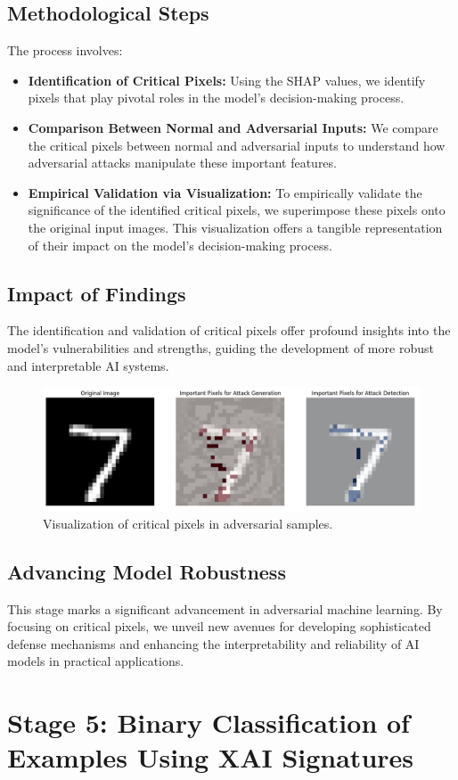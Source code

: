 \documentclass[10pt, conference, a4paper, final]{IEEEtran}
\begin{document}
    \subsection{Methodological Steps}
    The process involves:
    \begin{itemize}
        \item \textbf{Identification of Critical Pixels:} Using the SHAP values, we identify pixels that play pivotal roles in the model's decision-making process.
        \item \textbf{Comparison Between Normal and Adversarial Inputs:} We compare the critical pixels between normal and adversarial inputs to understand how adversarial attacks manipulate these important features.
        \item \textbf{Empirical Validation via Visualization:} To empirically validate the significance of the identified critical pixels, we superimpose these pixels onto the original input images. This visualization offers a tangible representation of their impact on the model's decision-making process.
    \end{itemize}
    
    \subsection{Impact of Findings}
    The identification and validation of critical pixels offer profound insights into the model's vulnerabilities and strengths, guiding the development of more robust and interpretable AI systems.
    
    \begin{figure}[h]
        \centering
        \includegraphics[width=\linewidth]{paper_images/criticalpixels.png}
        \caption{Visualization of critical pixels in adversarial samples.}
        \label{fig:adversarial}
    \end{figure}
    
    \subsection{Advancing Model Robustness}
    This stage marks a significant advancement in adversarial machine learning. By focusing on critical pixels, we unveil new avenues for developing sophisticated defense mechanisms and enhancing the interpretability and reliability of AI models in practical applications. \section{Stage 5: Binary Classification of Examples Using XAI Signatures}
\end{document}
